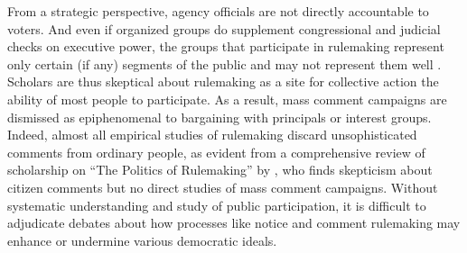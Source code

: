 From a strategic perspective, agency officials are not directly accountable to voters. And even if organized groups do supplement congressional and judicial checks on executive power, the groups that participate in rulemaking represent only certain (if any) segments of the public and may not represent them well \citep{Seifter2016UCLA}. Scholars are thus skeptical about rulemaking as a site for collective action the ability of most people to participate.
As a result, mass comment campaigns are dismissed as epiphenomenal to bargaining with principals or interest groups. Indeed, almost all empirical studies of rulemaking discard unsophisticated comments from ordinary people, as evident from a comprehensive review of scholarship on ``The Politics of Rulemaking'' by \citet{Yackee2018}, who finds skepticism about citizen comments but no direct studies of mass comment campaigns.
Without systematic understanding and study of public participation, it is difficult to adjudicate debates about how processes like notice and comment rulemaking may enhance or undermine various democratic ideals.

